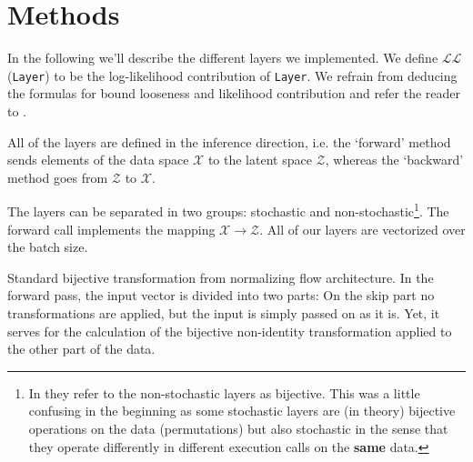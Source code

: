 \section{Methods}\label{sec:methods}

\label{sec:layers}

In the following we'll describe the different layers we implemented. We define $\mathcal{LL}$(\texttt{Layer}) to be the log-likelihood contribution of \texttt{Layer}. We refrain from deducing the formulas for bound looseness and likelihood contribution and refer the reader to \cite{nielsen2020survae}.

All of the layers are defined in the inference direction, i.e. the `forward' method sends elements of the data space $\mathcal{X}$ to the latent space $\mathcal{Z}$, whereas the `backward' method goes from $\mathcal{Z}$ to $\mathcal{X}$.

The layers can be separated in two groups: stochastic and non-stochastic\footnote{In \cite{nielsen2020survae} they refer to the non-stochastic layers as bijective. This was a little confusing in the beginning as some stochastic layers are (in theory) bijective operations on the data (permutations) but also stochastic in the sense that they operate differently in different execution calls on the \textbf{same} data.}. The forward call implements the mapping $\mathcal{X} \rightarrow \mathcal{Z}$. All of our layers are vectorized over the batch size. 


\label{sec:bijective}
Standard bijective transformation from normalizing flow architecture. In the forward pass, the input vector is divided into two parts: On the skip part no transformations are applied, but the input is simply passed on as it is. Yet, it serves for the calculation of the bijective non-identity transformation applied to the other part of the data.

